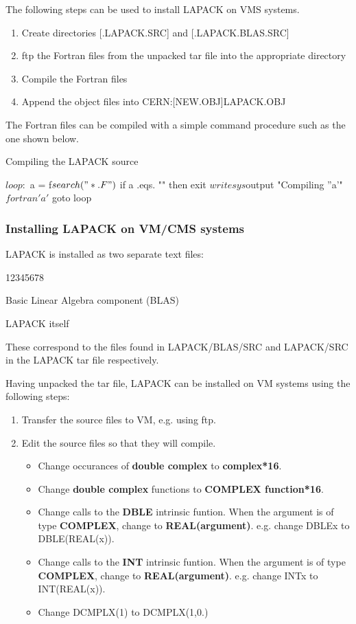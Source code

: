 The following steps can be used to install LAPACK on VMS systems.

\begin{enumerate}
\item
Create directories [.LAPACK.SRC] and [.LAPACK.BLAS.SRC]
\item
ftp the Fortran files from the unpacked tar file into the
appropriate directory
\item
Compile the Fortran files
\item
Append the object files into CERN:[NEW.OBJ]LAPACK.OBJ
\end{enumerate}

The Fortran files can be compiled with a simple command
procedure such as the one shown below.

\begin{XMPt}{Compiling the LAPACK source}

$ loop:
$ a = f$search("*.F")
$ if a .eqs. "" then exit
$ write sys$output "Compiling ''a'"
$ fortran 'a'
$ goto loop

\end{XMPt}

\subsubsection{Installing LAPACK on VM/CMS systems}

LAPACK is installed as two separate text files:
\begin{DLtt}{12345678}
\item[LABLASRC]Basic Linear Algebra component (BLAS)
\item[LAPACK]LAPACK itself
\end{DLtt}

These correspond to the files found in LAPACK/BLAS/SRC and LAPACK/SRC
in the LAPACK tar file respectively.

Having unpacked the tar file, LAPACK can be installed on VM systems using
the following steps:

\begin{enumerate}
\item
Transfer the source files to VM, e.g. using ftp.
\item
Edit the source files so that they will compile. 
\begin{itemize}
\item
Change occurances of {\bf double complex} to {\bf complex*16}.
\item
Change {\bf double complex} functions to {\bf COMPLEX function*16}.
\item
Change calls to the {\bf DBLE} intrinsic funtion. When the
argument is of type {\bf COMPLEX}, change to {\bf REAL(argument)}.
e.g. change DBLE{x} to DBLE(REAL(x)).
\item
Change calls to the {\bf INT} intrinsic funtion. When the
argument is of type {\bf COMPLEX}, change to {\bf REAL(argument)}.
e.g. change INT{x} to INT(REAL(x)).
\item
Change DCMPLX(1) to DCMPLX(1,0.)
\end{itemize}
\end{enumerate}

